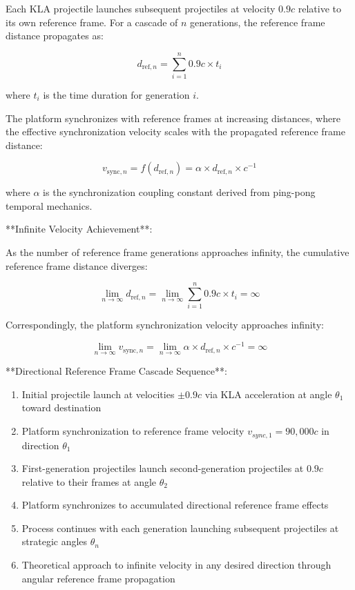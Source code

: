 \documentclass[12pt,a4paper]{article}
\theoremstyle{remark}
\begin{document}
Each KLA projectile launches subsequent projectiles at velocity $0.9c$ relative to its own reference frame. For a cascade of $n$ generations, the reference frame distance propagates as:

\begin{equation}
d_{\text{ref},n} = \sum_{i=1}^{n} 0.9c \times t_i
\end{equation}

where $t_i$ is the time duration for generation $i$.

The platform synchronizes with reference frames at increasing distances, where the effective synchronization velocity scales with the propagated reference frame distance:

\begin{equation}
v_{\text{sync},n} = f(d_{\text{ref},n}) = \alpha \times d_{\text{ref},n} \times c^{-1}
\end{equation}

where $\alpha$ is the synchronization coupling constant derived from ping-pong temporal mechanics.

**Infinite Velocity Achievement**:

As the number of reference frame generations approaches infinity, the cumulative reference frame distance diverges:

\begin{equation}
\lim_{n \to \infty} d_{\text{ref},n} = \lim_{n \to \infty} \sum_{i=1}^{n} 0.9c \times t_i = \infty
\end{equation}

Correspondingly, the platform synchronization velocity approaches infinity:

\begin{equation}
\lim_{n \to \infty} v_{\text{sync},n} = \lim_{n \to \infty} \alpha \times d_{\text{ref},n} \times c^{-1} = \infty
\end{equation}

**Directional Reference Frame Cascade Sequence**:

\begin{enumerate}
\item Initial projectile launch at velocities $\pm 0.9c$ via KLA acceleration at angle $\theta_1$ toward destination
\item Platform synchronization to reference frame velocity $v_{sync,1} = 90,000c$ in direction $\theta_1$
\item First-generation projectiles launch second-generation projectiles at $0.9c$ relative to their frames at angle $\theta_2$
\item Platform synchronizes to accumulated directional reference frame effects
\item Process continues with each generation launching subsequent projectiles at strategic angles $\theta_n$
\item Theoretical approach to infinite velocity in any desired direction through angular reference frame propagation
\end{enumerate}
\end{document}
